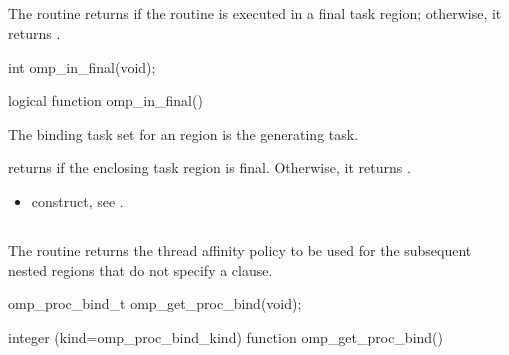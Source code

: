 \subsection{}
\label{subsec:omp_in_final}
\summary
The  routine returns  if the routine is executed in a final task 
region; otherwise, it returns .

\format
\ccppspecificstart
\begin{boxedcode}
int omp\_in\_final(void);
\end{boxedcode}
\ccppspecificend

\fortranspecificstart
\begin{boxedcode}
logical function omp\_in\_final()
\end{boxedcode}
\fortranspecificend

\binding
The binding task set for an  region is the generating task.

\effect
{} returns  if the enclosing task region is final. Otherwise, it returns 
.

\crossreferences
\begin{itemize}
\item {} construct, see 
. 
\end{itemize}









\subsection{}
\label{subsec:omp_get_proc_bind}
\summary
The  routine returns the thread affinity policy to be used for the 
subsequent nested  regions that do not specify a  clause.

\format
\ccppspecificstart
\begin{boxedcode}
omp\_proc\_bind\_t omp\_get\_proc\_bind(void);
\end{boxedcode}
\ccppspecificend

\fortranspecificstart
\begin{boxedcode}
integer (kind=omp\_proc\_bind\_kind) function omp\_get\_proc\_bind()
\end{boxedcode}
\fortranspecificend

